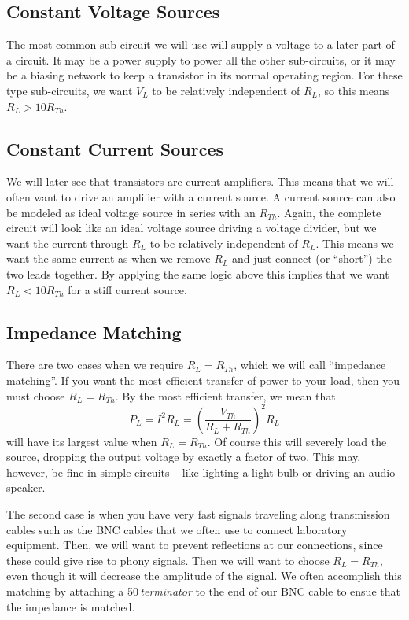 \documentclass{article}
\begin{document}
\subsection{Constant Voltage Sources}
The most common sub-circuit we will use will supply a voltage to a later part of a circuit. It may be a power supply to power all the other sub-circuits, or it may be a biasing network to keep a transistor in its normal operating region. For these type sub-circuits, we want $V_L$ to be relatively independent of $R_L$, so this means $R_L > 10 R_{Th}$.

\subsection{Constant Current Sources}
We will later see that transistors are current amplifiers. This means that we will often want to drive an amplifier with a current source. A current source can also be modeled as ideal voltage source in series with an $R_{Th}$. Again, the complete circuit will look like an ideal voltage source driving a voltage divider, but we want the current through $R_L$ to be relatively independent of $R_L$. This means we want the same current as when we remove $R_L$ and just connect (or ``short'') the two leads together. By applying the same logic above this implies that we want $R_L < 10 R_{Th}$ for a stiff current source.

\subsection{Impedance Matching}
There are two cases when we require $R_L = R_{Th}$, which we will call ``impedance matching''. If you want the most efficient transfer of power to your load, then you must choose $R_L = R_{Th}$. By the most efficient transfer, we mean that 
\begin{equation}
 P_L = I^2 R_L = \left( \frac{V_{Th}}{R_L + R_{Th}} \right)^2 R_L
\end{equation}
will have its largest value when $R_L = R_{Th}$. Of course this will severely load the source, dropping the output voltage by exactly a factor of two. This may, however, be fine in simple circuits -- like lighting a light-bulb or driving an audio speaker. 

The second case is when you have very fast signals traveling along transmission cables such as the BNC cables that we often use to connect laboratory equipment. Then, we will want to prevent reflections at our connections, since these could give rise to phony signals. Then we will want to choose $R_L = R_{Th}$, even though it will decrease the amplitude of the signal. We often accomplish this matching by attaching a 50\,\Ohm \emph{terminator} to the end of our BNC cable to ensue that the impedance is matched.
\end{document}
